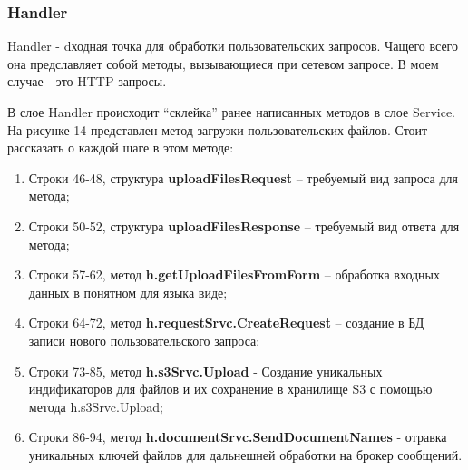 \begin{itemize}
\subsubsection{Handler}
Handler - dходная точка для обработки пользовательских запросов. Чащего всего она предславляет собой методы, вызывающиеся при сетевом запросе.
В моем случае - это HTTP запросы.

В слое Handler происходит “склейка” ранее написанных  методов в слое Service. На рисунке 14 представлен метод загрузки пользовательских файлов. Стоит рассказать о каждой шаге в этом методе:

\begin{enumerate}[label=\arabic*.]
\item Строки 46-48, структура \textbf{uploadFilesRequest}  – требуемый вид запроса для метода;
\item Строки 50-52, структура \textbf{uploadFilesResponse}  – требуемый вид ответа для метода;
\item Строки 57-62, метод \textbf{h.getUploadFilesFromForm}  – обработка входных данных в понятном для языка виде;
\item Строки 64-72, метод \textbf{h.requestSrvc.CreateRequest }  – создание в БД записи нового пользовательского запроса;
\item  Строки 73-85, метод \textbf{h.s3Srvc.Upload}  - Создание уникальных индификаторов для файлов и их сохранение в хранилище S3  с помощью метода h.s3Srvc.Upload; 
\item  Строки 86-94, метод \textbf{h.documentSrvc.SendDocumentNames}  - отравка уникальных ключей файлов для дальнешней обработки на брокер сообщений.
\end{enumerate}


\end{itemize}
